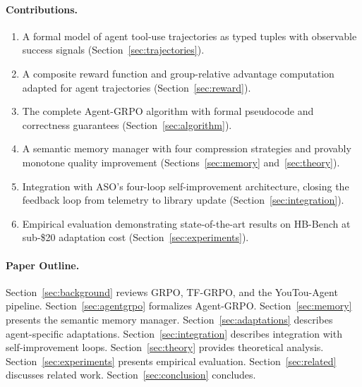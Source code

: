 \paragraph{Contributions.}
\begin{enumerate}[leftmargin=1.5em]
    \item A formal model of agent tool-use trajectories as typed tuples with
          observable success signals (Section~\ref{sec:trajectories}).
    \item A composite reward function and group-relative advantage computation
          adapted for agent trajectories (Section~\ref{sec:reward}).
    \item The complete Agent-GRPO algorithm with formal pseudocode and
          correctness guarantees (Section~\ref{sec:algorithm}).
    \item A semantic memory manager with four compression strategies and
          provably monotone quality improvement (Sections~\ref{sec:memory}
          and~\ref{sec:theory}).
    \item Integration with ASO's four-loop self-improvement architecture, closing
          the feedback loop from telemetry to library update
          (Section~\ref{sec:integration}).
    \item Empirical evaluation demonstrating state-of-the-art results on
          HB-Bench at sub-\$20 adaptation cost (Section~\ref{sec:experiments}).
\end{enumerate}

\paragraph{Paper Outline.}
Section~\ref{sec:background} reviews GRPO, TF-GRPO, and the YouTou-Agent
pipeline. Section~\ref{sec:agentgrpo} formalizes Agent-GRPO.
Section~\ref{sec:memory} presents the semantic memory manager.
Section~\ref{sec:adaptations} describes agent-specific adaptations.
Section~\ref{sec:integration} describes integration with self-improvement loops.
Section~\ref{sec:theory} provides theoretical analysis.
Section~\ref{sec:experiments} presents empirical evaluation.
Section~\ref{sec:related} discusses related work.
Section~\ref{sec:conclusion} concludes.

